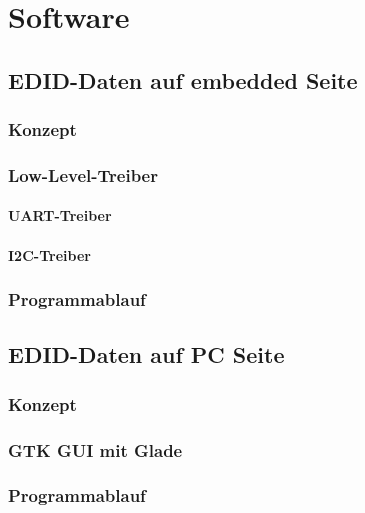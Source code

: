 \section{Software}
\label{sec:TeilB_Software}

\subsection{EDID-Daten auf embedded Seite}
\subsubsection{Konzept}
\subsubsection{Low-Level-Treiber}
\paragraph{UART-Treiber}
\paragraph{I2C-Treiber}
\subsubsection{Programmablauf}

\subsection{EDID-Daten auf PC Seite}
\subsubsection{Konzept}
\subsubsection{GTK GUI mit Glade}
\subsubsection{Programmablauf}
